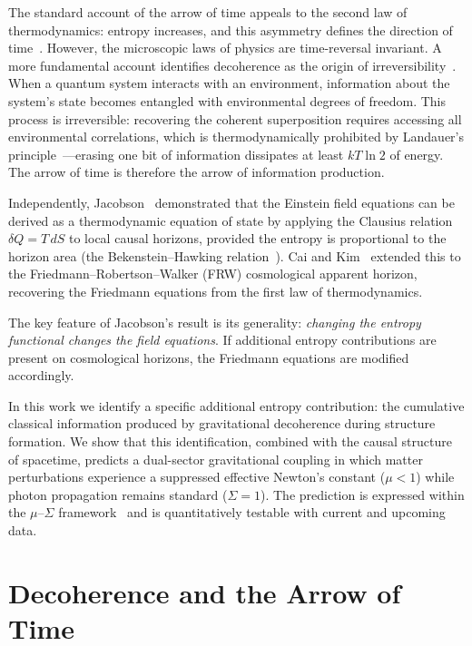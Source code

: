 \documentclass[11pt]{article}
\begin{document}
The standard account of the arrow of time appeals to the second law of
thermodynamics: entropy increases, and this asymmetry defines the direction of
time~\citep{Penrose1989}.  However, the microscopic laws of physics are
time-reversal invariant.  A more fundamental account identifies decoherence as
the origin of irreversibility~\citep{Zurek2003,Schlosshauer2007}.  When a
quantum system interacts with an environment, information about the system's
state becomes entangled with environmental degrees of freedom.  This process is
irreversible: recovering the coherent superposition requires accessing all
environmental correlations, which is thermodynamically prohibited by Landauer's
principle~\citep{Landauer1961}---erasing one bit of information dissipates at
least $kT\ln 2$ of energy.  The arrow of time is therefore the arrow of
information production.

Independently, Jacobson~\citep{Jacobson1995} demonstrated that the Einstein
field equations can be derived as a thermodynamic equation of state by applying
the Clausius relation $\delta Q = T\,dS$ to local causal horizons, provided the
entropy is proportional to the horizon area (the Bekenstein--Hawking
relation~\citep{Bekenstein1973,Hawking1975}).  Cai and
Kim~\citep{CaiKim2005} extended this to the Friedmann--Robertson--Walker (FRW)
cosmological apparent horizon, recovering the Friedmann equations from the first
law of thermodynamics.

The key feature of Jacobson's result is its generality: \emph{changing the
entropy functional changes the field equations}.  If additional entropy
contributions are present on cosmological horizons, the Friedmann equations are
modified accordingly.

In this work we identify a specific additional entropy contribution:
the cumulative classical information produced by gravitational decoherence
during structure formation.  We show that this identification, combined with
the causal structure of spacetime, predicts a dual-sector gravitational
coupling in which matter perturbations experience a suppressed effective
Newton's constant ($\mu < 1$) while photon propagation remains standard
($\Sigma = 1$).  The prediction is expressed within the $\mu$--$\Sigma$
framework~\citep{PogosianSilvestri2016} and is quantitatively testable with
current and upcoming data.


\section{Decoherence and the Arrow of Time}
\label{sec:decoherence}
\end{document}
